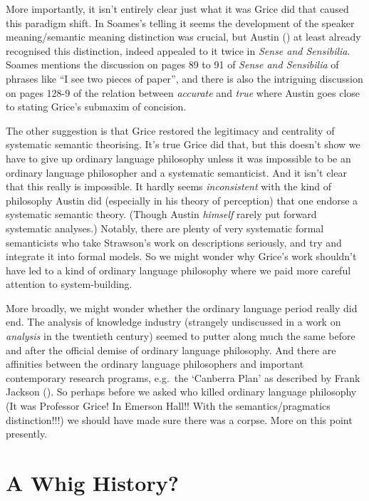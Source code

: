 \documentclass[
  11pt,
  letterpaper,
  DIV=11,
  numbers=noendperiod,
  twoside]{scrartcl}
\begin{document}
More importantly, it isn't entirely clear just what it was Grice did
that caused this paradigm shift. In Soames's telling it seems the
development of the speaker meaning/semantic meaning distinction was
crucial, but Austin () at least already
recognised this distinction, indeed appealed to it twice in \emph{Sense
and Sensibilia}. Soames mentions the discussion on pages 89 to 91 of
\emph{Sense and Sensibilia} of phrases like ``I see two pieces of
paper'', and there is also the intriguing discussion on pages 128-9 of
the relation between \emph{accurate} and \emph{true} where Austin goes
close to stating Grice's submaxim of concision.

The other suggestion is that Grice restored the legitimacy and
centrality of systematic semantic theorising. It's true Grice did that,
but this doesn't show we have to give up ordinary language philosophy
unless it was impossible to be an ordinary language philosopher and a
systematic semanticist. And it isn't clear that this really is
impossible. It hardly seems \emph{inconsistent} with the kind of
philosophy Austin did (especially in his theory of perception) that one
endorse a systematic semantic theory. (Though Austin \emph{himself}
rarely put forward systematic analyses.) Notably, there are plenty of
very systematic formal semanticists who take Strawson's work on
descriptions seriously, and try and integrate it into formal models. So
we might wonder why Grice's work shouldn't have led to a kind of
ordinary language philosophy where we paid more careful attention to
system-building.

More broadly, we might wonder whether the ordinary language period
really did end. The analysis of knowledge industry (strangely
undiscussed in a work on \emph{analysis} in the twentieth century)
seemed to putter along much the same before and after the official
demise of ordinary language philosophy. And there are affinities between
the ordinary language philosophers and important contemporary research
programs, e.g.~the `Canberra Plan' as described by Frank Jackson
(). So perhaps before we asked who
killed ordinary language philosophy (It was Professor Grice! In Emerson
Hall!! With the semantics/pragmatics distinction!!!) we should have made
sure there was a corpse. More on this point presently.

\section{A Whig History?}\label{a-whig-history}
\end{document}
